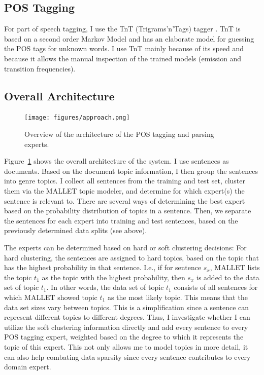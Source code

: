 \subsection{POS Tagging}

For part of speech tagging, I use the TnT (Trigrams'n'Tags) tagger \cite{brants:00.2}. TnT is based on a second order Markov Model and has an elaborate model for guessing the POS tags for unknown words. I use TnT mainly because of its speed and because it allows the manual inspection of the trained models (emission and transition frequencies).

\subsection{Overall Architecture}

\begin{figure}[!t]
    \centering
    \texttt{[image: figures/approach.png]}
 \caption{Overview of the architecture of the POS tagging and parsing experts.}\label{fig:architecture0}   
 \end{figure}

Figure~\ref{fig:architecture0} shows the overall architecture of the system. 
I use sentences as documents. Based on the document topic information, I then group the sentences into genre topics. I collect all sentences from the training and test set, cluster them via the MALLET topic modeler, and determine for which expert(s) the sentence is relevant to. There are several ways of determining the best expert based on the probability distribution of topics in a sentence. Then, we separate the sentences for each expert into training and test sentences, based on the previously determined data splits (see above).

The experts can be determined based on hard or soft clustering decisions: For hard clustering, the sentences are assigned to hard topics, based on the topic that has the highest probability in that sentence. I.e., if for sentence $s_x$, MALLET lists the topic $t_1$ as the topic with the highest probability, then $s_x$ is added to the data set of topic $t_1$. In other words, the data set of topic $t_1$ consists of all sentences for which MALLET showed topic $t_1$ as the most likely topic. This means that the data set sizes vary between topics. This is a simplification since a sentence can represent different topics to different degrees. Thus, I investigate whether I can utilize the soft clustering information directly and add every sentence to every POS tagging expert, weighted based on the degree to which it represents the topic of this expert. This not only allows me to model topics in more detail, it can also help combating data sparsity since every sentence contributes to every domain expert.


